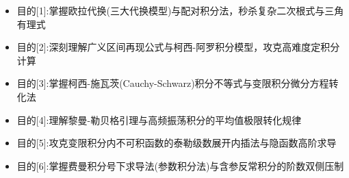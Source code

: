 \documentclass[11pt,a4paper,UTF8]{ctexart}
\begin{document}
\pagestyle{fancy}
\fancyhf{}
\fancyhead[R]{\small\color{TitlePurple}\nouppercase{\leftmark}}
\renewcommand{\headrulewidth}{0.5pt}

\tableofcontents
\newpage
{}


\begin{targetbox}[本章复习目标与核心知识图谱]
\begin{itemize}
  \item 目的[1]:掌握欧拉代换(三大代换模型)与配对积分法，秒杀复杂二次根式与三角有理式
\end{itemize}
\end{targetbox}

\begin{targetbox}[本章复习目标与核心知识图谱]
\begin{itemize}
  \item 目的[2]:深刻理解广义区间再现公式与柯西-阿罗积分模型，攻克高难度定积分计算
\end{itemize}
\end{targetbox}

\begin{targetbox}[本章复习目标与核心知识图谱]
\begin{itemize}
  \item 目的[3]:掌握柯西-施瓦茨(Cauchy-Schwarz)积分不等式与变限积分微分方程转化法
\end{itemize}
\end{targetbox}

\begin{targetbox}[本章复习目标与核心知识图谱]
\begin{itemize}
  \item 目的[4]:理解黎曼-勒贝格引理与高频振荡积分的平均值极限转化规律
\end{itemize}
\end{targetbox}

\begin{targetbox}[本章复习目标与核心知识图谱]
\begin{itemize}
  \item 目的[5]:攻克变限积分内不可积函数的泰勒级数展开内插法与隐函数高阶求导
\end{itemize}
\end{targetbox}

\begin{targetbox}[本章复习目标与核心知识图谱]
\begin{itemize}
  \item 目的[6]:掌握费曼积分号下求导法(参数积分法)与含参反常积分的阶数双侧压制
\end{itemize}
\end{targetbox}
\end{document}
